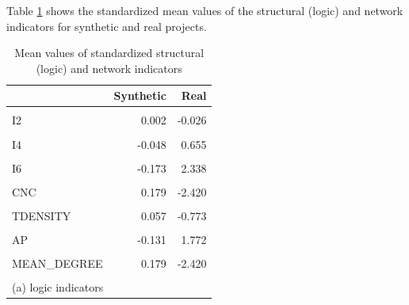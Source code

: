 \documentclass[preprint,
3p]{elsarticle} %
\begin{document}
Table \ref{tab:MEANS_LOGIC} shows the standardized mean values of the
structural (logic) and network indicators for synthetic and real
projects.

\begin{table}[H]
\centering
\caption{\label{tab:MEANS_LOGIC}Mean values of standardized structural (logic) and network indicators}
\begin{minipage}{0.48\linewidth}
\begingroup\fontsize{8}{10}\selectfont

\begin{tabular}{lrr}
\toprule
\textbf{ } & \textbf{Synthetic} & \textbf{Real}\\
\midrule
\cellcolor{gray!10}{TASKS} & \cellcolor{gray!10}{0.055} & \cellcolor{gray!10}{-0.745}\\
I2 & 0.002 & -0.026\\
\cellcolor{gray!10}{I3} & \cellcolor{gray!10}{-0.126} & \cellcolor{gray!10}{1.700}\\
I4 & -0.048 & 0.655\\
\cellcolor{gray!10}{I5} & \cellcolor{gray!10}{0.016} & \cellcolor{gray!10}{-0.215}\\
\addlinespace
I6 & -0.173 & 2.338\\
\cellcolor{gray!10}{C} & \cellcolor{gray!10}{0.111} & \cellcolor{gray!10}{-1.497}\\
CNC & 0.179 & -2.420\\
\cellcolor{gray!10}{OS} & \cellcolor{gray!10}{0.170} & \cellcolor{gray!10}{-2.303}\\
TDENSITY & 0.057 & -0.773\\
\addlinespace
\cellcolor{gray!10}{XDENSITY} & \cellcolor{gray!10}{0.025} & \cellcolor{gray!10}{-0.345}\\
AP & -0.131 & 1.772\\
\cellcolor{gray!10}{COMPS} & \cellcolor{gray!10}{-0.054} & \cellcolor{gray!10}{0.732}\\
MEAN\_DEGREE & 0.179 & -2.420\\
\cellcolor{gray!10}{NARC} & \cellcolor{gray!10}{0.083} & \cellcolor{gray!10}{-1.126}\\
\bottomrule
\multicolumn{3}{l}{\rule{0pt}{1em}(a) logic indicators}\\
\end{tabular}
\endgroup{}
\end{minipage}\quad
\begin{minipage}{0.48\linewidth}
\begingroup\fontsize{8}{10}\selectfont


\end{minipage}
\end{table}
\end{document}
